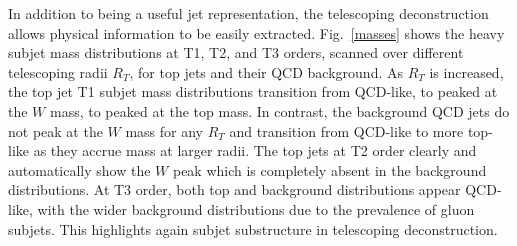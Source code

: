 \documentclass[notoc]{JHEP3}
\DeclareRobustCommand{\Fig}[1]{Fig.~\ref{#1}}
\begin{document}
In addition to being a useful jet representation, the telescoping deconstruction allows physical information to be easily extracted. \Fig{masses} shows the heavy subjet mass distributions at T1, T2, and T3 orders, scanned over different telescoping radii $R_T$, for top jets and their QCD background. As $R_T$ is increased, the top jet T1 subjet mass distributions transition from QCD-like, to peaked at the $W$ mass, to peaked at the top mass. In contrast, the background QCD jets do not peak at the $W$ mass for any $R_T$ and transition from QCD-like to more top-like as they %
accrue mass at larger radii. The top jets at T2 order clearly and automatically show the $W$ peak which is completely absent in the background distributions. At T3 order, both top and background distributions appear QCD-like, with the wider background distributions %
due to the prevalence of gluon subjets. This highlights again subjet substructure in telescoping deconstruction.



\end{document}
